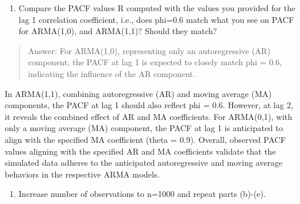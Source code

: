 \documentclass[
]{article}
\providecommand{\tightlist}{%
  \setlength{\itemsep}{0pt}\setlength{\parskip}{0pt}}
\begin{document}
\begin{enumerate}
\def\labelenumi{(\alph{enumi})}
\setcounter{enumi}{4}
\tightlist
\item
  Compare the PACF values R computed with the values you provided for
  the lag 1 correlation coefficient, i.e., does phi=0.6 match what you
  see on PACF for ARMA(1,0), and ARMA(1,1)? Should they match?
\end{enumerate}

\begin{quote}
Answer: For ARMA(1,0), representing only an autoregressive (AR)
component, the PACF at lag 1 is expected to closely match phi = 0.6,
indicating the influence of the AR component.
\end{quote}

In ARMA(1,1), combining autoregressive (AR) and moving average (MA)
components, the PACF at lag 1 should also reflect phi = 0.6. However, at
lag 2, it reveals the combined effect of AR and MA coefficients. For
ARMA(0,1), with only a moving average (MA) component, the PACF at lag 1
is anticipated to align with the specified MA coefficient (theta = 0.9).
Overall, observed PACF values aligning with the specified AR and MA
coefficients validate that the simulated data adheres to the anticipated
autoregressive and moving average behaviors in the respective ARMA
models.

\begin{enumerate}
\def\labelenumi{(\alph{enumi})}
\setcounter{enumi}{5}
\tightlist
\item
  Increase number of observations to n=1000 and repeat parts (b)-(e).
\end{enumerate}
\end{document}
